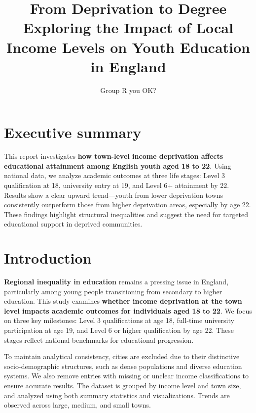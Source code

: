\documentclass[11pt,en]{../tex/elegantpaper}
\title{From Deprivation to Degree \\[1ex] \large Exploring the Impact of
Local Income Levels on Youth Education in England}
\author{Group R you OK?}
\date{}
\begin{document}
\maketitle
\thispagestyle{empty}
\clearpage

\tableofcontents
\thispagestyle{empty}
\clearpage

\setcounter{page}{1}

\newpage

\section{Executive summary}\label{executive-summary}

This report investigates \textbf{how town-level income deprivation
affects educational attainment among English youth aged 18 to 22}. Using
national data, we analyze academic outcomes at three life stages: Level
3 qualification at 18, university entry at 19, and Level 6+ attainment
by 22. Results show a clear upward trend---youth from lower deprivation
towns consistently outperform those from higher deprivation areas,
especially by age 22. These findings highlight structural inequalities
and suggest the need for targeted educational support in deprived
communities.

\section{Introduction}\label{introduction}

\textbf{Regional inequality in education} remains a pressing issue in
England, particularly among young people transitioning from secondary to
higher education. This study examines \textbf{whether income deprivation
at the town level impacts academic outcomes for individuals aged 18 to
22}. We focus on three key milestones: Level 3 qualifications at age 18,
full-time university participation at age 19, and Level 6 or higher
qualification by age 22. These stages reflect national benchmarks for
educational progression.

To maintain analytical consistency, cities are excluded due to their
distinctive socio-demographic structures, such as dense populations and
diverse education systems. We also remove entries with missing or
unclear income classifications to ensure accurate results. The dataset
is grouped by income level and town size, and analyzed using both
summary statistics and visualizations. Trends are observed across large,
medium, and small towns.
\end{document}

